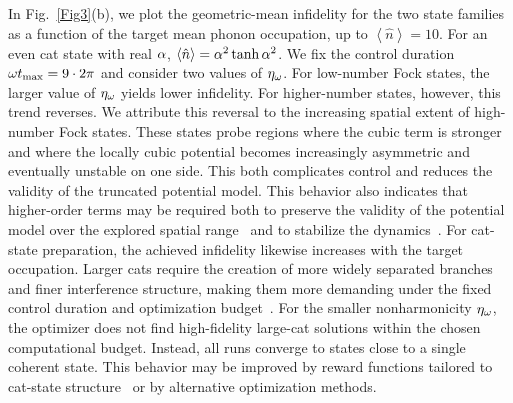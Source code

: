 \documentclass[reprint,prx,footinbib,floatfix,twocolumn,longbibliography,superscriptaddress]{revtex4-2}
\begin{document}
In Fig.~\ref{Fig3}(b), we plot the geometric-mean infidelity for the two state families as a function of the target mean phonon occupation, up to $\left<\hat{n}\right> = 10$.
For an even cat state with real $\alpha$, $\left<\hat{n}\right> = \alpha^2 \tanh \alpha^2$.
We fix the control duration $\omega t_\text{max} = 9 \cdot 2 \pi$ and consider two values of $\eta_{\omega}$.
For low-number Fock states, the larger value of $\eta_{\omega}$ yields lower infidelity. For higher-number states, however, this trend reverses.
We attribute this reversal to the increasing spatial extent of high-number Fock states.
These states probe regions where the cubic term is stronger and where the locally cubic potential becomes increasingly asymmetric and eventually unstable on one side.
This both complicates control and reduces the validity of the truncated potential model.
This behavior also indicates that higher-order terms may be required both to preserve the validity of the potential model over the explored spatial range~\cite{Roda-Llordes2024b} and to stabilize the dynamics~\cite{vanFrank2016a}.
For cat-state preparation, the achieved infidelity likewise increases with the target occupation.
Larger cats require the creation of more widely separated branches and finer interference structure, making them more demanding under the fixed control duration and optimization budget~\cite{Rojan2014}.
For the smaller nonharmonicity $\eta_{\omega}$, the optimizer does not find high-fidelity large-cat solutions within the chosen computational budget.
Instead, all runs converge to states close to a single coherent state.
This behavior may be improved by reward functions tailored to cat-state structure~\cite{Krauss2023} or by alternative optimization methods.
\end{document}
